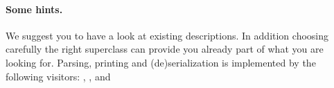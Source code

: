\documentclass[a4paper,10pt,twoside]{book}
\begin{document}
\paragraph{Some hints.} We suggest you to have a look at existing descriptions. In addition choosing carefully the right superclass can provide you already part of what you are looking for.  Parsing, printing and (de)serialization is implemented by the following visitors: , ,  and 


 
% 
% 
% 
% 
% 
\end{document}
